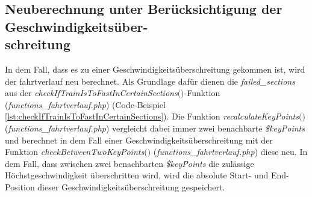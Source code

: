 \subsection{Neuberechnung unter Berücksichtigung der Geschwindigkeitsüber-\\schreitung} \label{neuberechnung}
In dem Fall, dass es zu einer Geschwindigkeitsüberschreitung gekommen ist, wird der \Gls{fahrtverlauf} neu berechnet. Als Grundlage dafür dienen die \textit{failed\_sections} aus der \textit{check\-If\-Train\-Is\-To\-Fast\-In\-Certain\-Sections$($$)$}-Funktion (\textit{functions\_fahrtverlauf.php}) (Code-Beispiel \ref{lst:checkIfTrainIsToFastInCertainSections}). Die Funktion \textit{recalculate\-Key\-Points$($$)$} (\textit{functions\_fahrtverlauf.php}) vergleicht dabei immer zwei benachbarte \textit{\$keyPoints} und berechnet in dem Fall einer Geschwindigkeitsüberschreitung mit der Funktion \textit{check\-Between\-Two\-Key\-Points$($$)$} (\textit{func\-tions\_fahrt\-ver\-lauf\-.php}) diese neu. In dem Fall, dass zwischen zwei benachbarten \textit{\$keyPoints} die zulässige Höchst\-ge\-schwin\-dig\-keit überschritten wird, wird die absolute Start- und End-Position dieser Ge\-schwin\-digkeits\-über\-schrei\-tung gespeichert. 

